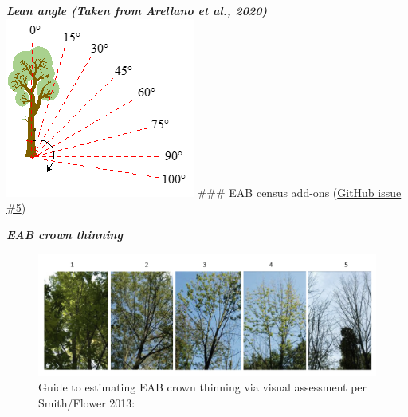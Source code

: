 \documentclass[
]{article}
\begin{document}
\newpage

\textbf{\emph{Lean angle (Taken from Arellano et al., 2020)}}
\includegraphics{figures_tables/Tree_angle.png} \#\#\# EAB census
add-ons
(\href{https://github.com/SCBI-ForestGEO/SCBImortality/issues/5}{GitHub
issue \#5})

\textbf{\emph{EAB crown thinning}}

\begin{figure}
\centering
\includegraphics{figures_tables/Ash_crown_assessment.png}
\caption{Guide to estimating EAB crown thinning via visual assessment
per Smith/Flower 2013:}
\end{figure}
\end{document}
